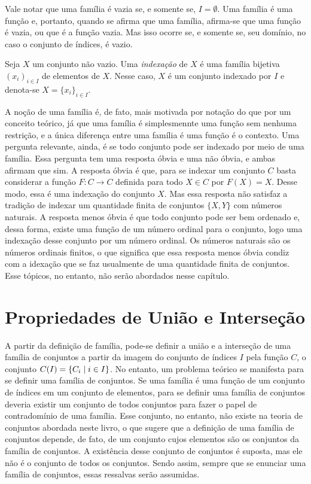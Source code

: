 Vale notar que uma família é vazia se, e somente se, $I=\emptyset$. Uma família é uma função e, portanto, quando se afirma que uma família, afirma-se que uma função é vazia, ou que é a função vazia. Mas isso ocorre se, e somente se, seu domínio, no caso o conjunto de índices, é vazio.

\begin{defi}
	Seja $X$ um conjunto não vazio. Uma \emph{indexação} de $X$ é uma família bijetiva $(x_i)_{i \in I}$ de elementos de $X$. Nesse caso, $X$ é um conjunto indexado por $I$ e denota-se $X=\{x_i\}_{i \in I}$.
\end{defi}

A noção de uma família é, de fato, mais motivada por notação do que por um conceito teórico, já que uma família é simplesmennte uma função sem nenhuma restrição, e a única diferença entre uma família é uma função é o contexto. Uma pergunta relevante, ainda, é se todo conjunto pode ser indexado por meio de uma família. Essa pergunta tem uma resposta óbvia e uma não óbvia, e ambas afirmam que sim. A resposta óbvia é que, para se indexar um conjunto $C$ basta considerar a função $F: C \to C$ definida para todo $X \in C$ por $F(X)=X$. Desse modo, essa é uma indexação do conjunto $X$. Mas essa resposta não satisfaz a tradição de indexar um quantidade finita de conjuntos $\{X,Y\}$ com números naturais. A resposta menos óbvia é que todo conjunto pode ser bem ordenado e, dessa forma, existe uma função de um número ordinal para o conjunto, logo uma indexação desse conjunto por um número ordinal. Os números naturais são os números ordinais finitos, o que significa que essa resposta menos óbvia condiz com a idexação que se faz usualmente de uma quantidade finita de conjuntos. Esse tópicos, no entanto, não serão abordados nesse capítulo.

\section{Propriedades de União e Interseção}

A partir da definição de família, pode-se definir a união e a interseção de uma família de conjuntos a partir da imagem do conjunto de índices $I$ pela função $C$, o conjunto $C(I) = \left\{C_i \;\middle\vert\; i \in I \right\}$. No entanto, um problema teórico se manifesta para se definir uma família de conjuntos. Se uma família é uma função de um conjunto de índices em um conjunto de elementos, para se definir uma família de conjuntos deveria existir um conjunto de todos conjuntos para fazer o papel de contradomínio de uma família. Esse conjunto, no entanto, não existe na teoria de conjuntos abordada neste livro, o que sugere que a definição de uma família de conjuntos depende, de fato, de um conjunto cujos elementos são os conjuntos da família de conjuntos. A existência desse conjunto de conjuntos é suposta, mas ele não é o conjunto de todos os conjuntos. Sendo assim, sempre que se enunciar uma família de conjuntos, essas ressalvas serão assumidas.

